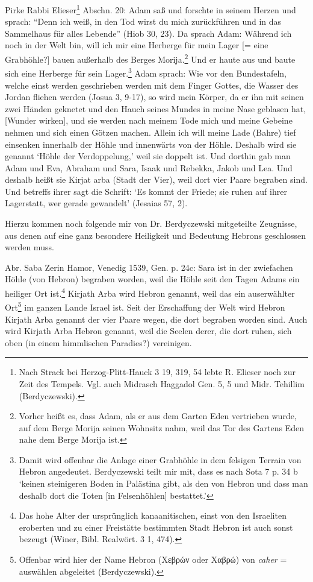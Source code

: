 \documentclass[a4paper, 11pt, oneside]{article}
\begin{document}
Pirke Rabbi Elieser\footnote{Nach Strack bei Herzog-Plitt-Hauck 3 19, 319, 54 lebte R. Elieser noch zur Zeit des Tempels. Vgl. auch Midrasch Haggadol Gen. 5, 5 und Midr. Tehillim (Berdyczewski).} Abschn. 20: Adam saß und forschte in seinem Herzen und sprach: "`Denn ich weiß, in den Tod wirst du mich zurückführen und in das Sammelhaus für alles Lebende"' (Hiob 30, 23). Da sprach Adam: Während ich noch in der Welt bin, will ich mir eine Herberge für mein Lager [= eine Grabhöhle?] bauen außerhalb des Berges Morija.\footnote{Vorher heißt es, dass Adam, als er aus dem Garten Eden vertrieben wurde, auf dem Berge Morija seinen Wohnsitz nahm, weil das Tor des Gartens Eden nahe dem Berge Morija ist.} Und er haute aus und baute sich eine Herberge für sein Lager.\footnote{Damit wird offenbar die Anlage einer Grabhöhle in dem felsigen Terrain von Hebron angedeutet. Berdyczewski teilt mir mit, dass es nach Sota 7 p. 34 b `keinen steinigeren Boden in Palästina gibt, als den von Hebron und dass man deshalb dort die Toten [in Felsenhöhlen] bestattet.'} Adam sprach: Wie vor den Bundestafeln, welche einst werden geschrieben werden mit dem Finger Gottes, die Wasser des Jordan fliehen werden (Josua 3, 9-17), so wird mein Körper, da er ihn mit seinen zwei Händen geknetet und den Hauch seines Mundes in meine Nase geblasen hat, [Wunder wirken], und sie werden nach meinem Tode mich und meine Gebeine nehmen und sich einen Götzen machen. Allein ich will meine Lade (Bahre) tief einsenken innerhalb der Höhle und innenwärts von der Höhle. Deshalb wird sie genannt `Höhle der Verdoppelung,' weil sie doppelt ist. Und dorthin gab man Adam und Eva, Abraham und Sara, Isaak und Rebekka, Jakob und Lea. Und deshalb heißt sie Kirjat arba (Stadt der Vier), weil dort vier Paare begraben sind. Und betreffs ihrer sagt die Schrift: `Es kommt der Friede; sie ruhen auf ihrer Lagerstatt, wer gerade gewandelt' (Jesaias 57, 2).

Hierzu kommen noch folgende mir von Dr. Berdyczewski mitgeteilte Zeugnisse, aus denen auf eine ganz besondere Heiligkeit und Bedeutung Hebrons geschlossen werden muss.

Abr. Saba Zerin Hamor, Venedig 1539, Gen. p. 24c: Sara ist in der zwiefachen Höhle (von Hebron) begraben worden, weil die Höhle seit den Tagen Adams ein heiliger Ort ist.\footnote{Das hohe Alter der ursprünglich kanaanitischen, einst von den Israeliten eroberten und zu einer Freistätte bestimmten Stadt Hebron ist auch sonst bezeugt (Winer, Bibl. Realwört. 3 1, 474).} Kirjath Arba wird Hebron genannt, weil das ein auserwählter Ort\footnote{Offenbar wird hier der Name Hebron (Χεβρών oder Χαβρώ) von \emph{caher} = auswählen abgeleitet (Berdyczewski).} im ganzen Lande Israel ist. Seit der Erschaffung der Welt wird Hebron Kirjath Arba genannt der vier Paare wegen, die dort begraben worden sind. Auch wird Kirjath Arba Hebron genannt, weil die Seelen derer, die dort ruhen, sich oben (in einem himmlischen Paradies?) vereinigen.
\end{document}
